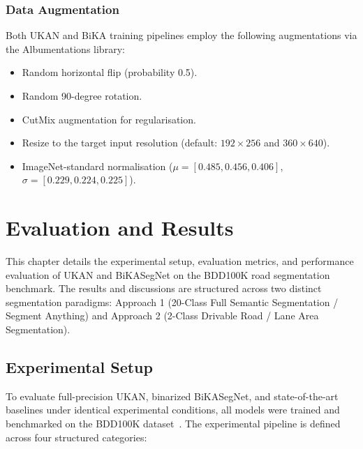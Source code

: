 \documentclass[a4paper]{report}
\begin{document}
\subsection{Data Augmentation}
Both UKAN and BiKA training pipelines employ the following augmentations via the Albumentations library:
\begin{itemize}
    \item Random horizontal flip (probability 0.5).
    \item Random 90-degree rotation.
    \item CutMix augmentation for regularisation.
    \item Resize to the target input resolution (default: $192 \times 256$ and $360 \times 640$).
    \item ImageNet-standard normalisation ($\mu = [0.485, 0.456, 0.406]$, $\sigma = [0.229, 0.224, 0.225]$).
\end{itemize}

\chapter{Evaluation and Results}

This chapter details the experimental setup, evaluation metrics, and performance evaluation of UKAN and BiKASegNet on the BDD100K road segmentation benchmark. The results and discussions are structured across two distinct segmentation paradigms: Approach 1 (20-Class Full Semantic Segmentation / Segment Anything) and Approach 2 (2-Class Drivable Road / Lane Area Segmentation).

\section{Experimental Setup}
\label{sec:exp_setup}
To evaluate full-precision UKAN, binarized BiKASegNet, and state-of-the-art baselines under identical experimental conditions, all models were trained and benchmarked on the BDD100K dataset~\cite{bdd100k2020}. The experimental pipeline is defined across four structured categories:
\end{document}
